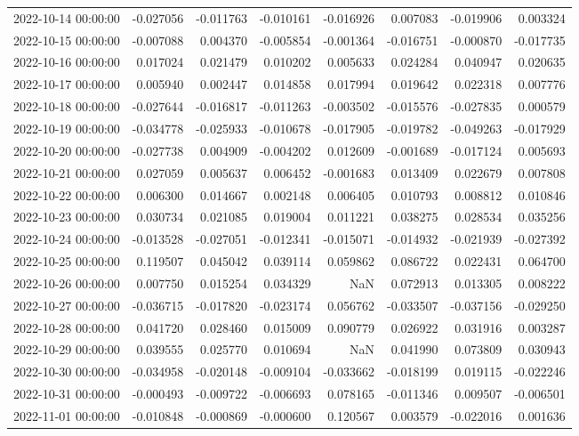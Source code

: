 \begin{tabular}{lrrrrrrr}
2022-10-14 00:00:00 & -0.027056 & -0.011763 & -0.010161 & -0.016926 & 0.007083 & -0.019906 & 0.003324 \\
2022-10-15 00:00:00 & -0.007088 & 0.004370 & -0.005854 & -0.001364 & -0.016751 & -0.000870 & -0.017735 \\
2022-10-16 00:00:00 & 0.017024 & 0.021479 & 0.010202 & 0.005633 & 0.024284 & 0.040947 & 0.020635 \\
2022-10-17 00:00:00 & 0.005940 & 0.002447 & 0.014858 & 0.017994 & 0.019642 & 0.022318 & 0.007776 \\
2022-10-18 00:00:00 & -0.027644 & -0.016817 & -0.011263 & -0.003502 & -0.015576 & -0.027835 & 0.000579 \\
2022-10-19 00:00:00 & -0.034778 & -0.025933 & -0.010678 & -0.017905 & -0.019782 & -0.049263 & -0.017929 \\
2022-10-20 00:00:00 & -0.027738 & 0.004909 & -0.004202 & 0.012609 & -0.001689 & -0.017124 & 0.005693 \\
2022-10-21 00:00:00 & 0.027059 & 0.005637 & 0.006452 & -0.001683 & 0.013409 & 0.022679 & 0.007808 \\
2022-10-22 00:00:00 & 0.006300 & 0.014667 & 0.002148 & 0.006405 & 0.010793 & 0.008812 & 0.010846 \\
2022-10-23 00:00:00 & 0.030734 & 0.021085 & 0.019004 & 0.011221 & 0.038275 & 0.028534 & 0.035256 \\
2022-10-24 00:00:00 & -0.013528 & -0.027051 & -0.012341 & -0.015071 & -0.014932 & -0.021939 & -0.027392 \\
2022-10-25 00:00:00 & 0.119507 & 0.045042 & 0.039114 & 0.059862 & 0.086722 & 0.022431 & 0.064700 \\
2022-10-26 00:00:00 & 0.007750 & 0.015254 & 0.034329 & NaN & 0.072913 & 0.013305 & 0.008222 \\
2022-10-27 00:00:00 & -0.036715 & -0.017820 & -0.023174 & 0.056762 & -0.033507 & -0.037156 & -0.029250 \\
2022-10-28 00:00:00 & 0.041720 & 0.028460 & 0.015009 & 0.090779 & 0.026922 & 0.031916 & 0.003287 \\
2022-10-29 00:00:00 & 0.039555 & 0.025770 & 0.010694 & NaN & 0.041990 & 0.073809 & 0.030943 \\
2022-10-30 00:00:00 & -0.034958 & -0.020148 & -0.009104 & -0.033662 & -0.018199 & 0.019115 & -0.022246 \\
2022-10-31 00:00:00 & -0.000493 & -0.009722 & -0.006693 & 0.078165 & -0.011346 & 0.009507 & -0.006501 \\
2022-11-01 00:00:00 & -0.010848 & -0.000869 & -0.000600 & 0.120567 & 0.003579 & -0.022016 & 0.001636 \\

\end{tabular}

